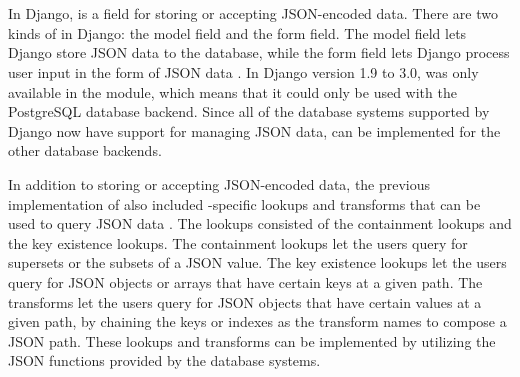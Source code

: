 \section{}

In Django,  is a field for storing or accepting JSON-encoded
data. There are two kinds of  in Django: the model field and
the form field. The model field lets Django store JSON data to the database,
while the form field lets Django process user input in the form of JSON data
\cite{django30_modeljsonfield, django30_formjsonfield}. In Django version
1.9 to 3.0,  was only available in the
 module, which means that it could only be used
with the PostgreSQL database backend. Since all of the database systems
supported by Django now have support for managing JSON data, 
can be implemented for the other database backends.

In addition to storing or accepting JSON-encoded data, the previous
implementation of  also included -specific
lookups and transforms that can be used to query JSON data
\cite{django30_modeljsonfield}. The lookups consisted of the containment
lookups and the key existence lookups. The containment lookups let the users
query for supersets or the subsets of a JSON value. The key existence lookups
let the users query for JSON objects or arrays that have certain keys at a
given path. The transforms let the users query for JSON objects that have
certain values at a given path, by chaining the keys or indexes as the
transform names to compose a JSON path. These lookups and transforms can be
implemented by utilizing the JSON functions provided by the database systems.
